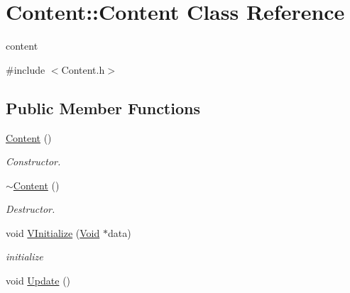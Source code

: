 \hypertarget{classContent_1_1Content}{
\section{Content::Content Class Reference}
\label{classContent_1_1Content}
}


content  


{\ttfamily \#include $<$Content.h$>$}\subsection*{Public Member Functions}
\begin{DoxyCompactItemize}
\item 
\hypertarget{classContent_1_1Content_a4ddae93ad8e07310aeac04ea9f694440}{
\hyperlink{classContent_1_1Content_a4ddae93ad8e07310aeac04ea9f694440}{Content} ()}
\label{classContent_1_1Content_a4ddae93ad8e07310aeac04ea9f694440}

\begin{DoxyCompactList}\small\item\em Constructor. \item\end{DoxyCompactList}\item 
\hypertarget{classContent_1_1Content_a4c38327bafb503f9408cdc9bb0393ca5}{
\hyperlink{classContent_1_1Content_a4c38327bafb503f9408cdc9bb0393ca5}{$\sim$Content} ()}
\label{classContent_1_1Content_a4c38327bafb503f9408cdc9bb0393ca5}

\begin{DoxyCompactList}\small\item\em Destructor. \item\end{DoxyCompactList}\item 
\hypertarget{classContent_1_1Content_a578e43ad0b0be4e5decd24892793d8ba}{
void \hyperlink{classContent_1_1Content_a578e43ad0b0be4e5decd24892793d8ba}{VInitialize} (\hyperlink{structVoid}{Void} $\ast$data)}
\label{classContent_1_1Content_a578e43ad0b0be4e5decd24892793d8ba}

\begin{DoxyCompactList}\small\item\em initialize \item\end{DoxyCompactList}\item 
\hypertarget{classContent_1_1Content_a7115d7ec62760c1a6f8d59560c13abd8}{
void \hyperlink{classContent_1_1Content_a7115d7ec62760c1a6f8d59560c13abd8}{Update} ()}
\label{classContent_1_1Content_a7115d7ec62760c1a6f8d59560c13abd8}


\end{DoxyCompactItemize}
